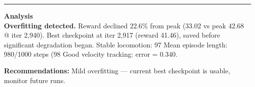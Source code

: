 \documentclass[a4paper,10pt]{article}
\begin{document}
\vspace{2pt}
\hrule
\vspace{2pt}

\footnotesize
\textbf{Analysis} \\[1pt]
\textbf{Overfitting detected.} Reward declined 22.6\% from peak (33.02 vs peak 42.68 @ iter 2,940).
Best checkpoint at iter 2,917 (reward 41.46), saved before significant degradation began.
Stable locomotion: 97%
Mean episode length: 980/1000 steps (98%
Good velocity tracking: error = 0.340.

\textbf{Recommendations:}
Mild overfitting --- current best checkpoint is usable, monitor future runs.
\end{document}
